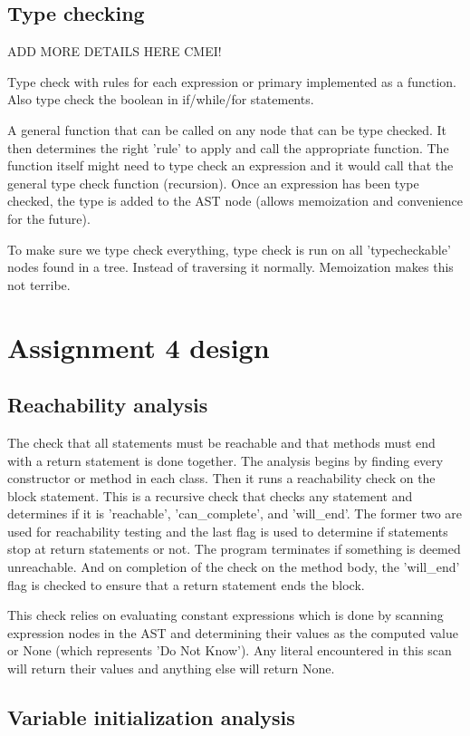 \documentclass[12pt]{article}
\begin{document}
\subsection{Type checking}
ADD MORE DETAILS HERE CMEI!

Type check with rules for each expression or primary implemented as a function.
Also type check the boolean in if/while/for statements.

A general function that can be called on any node that can be type checked.
It then determines the right 'rule' to apply and call the appropriate function.
The function itself might need to type check an expression and it would
call that the general type check function (recursion). Once an expression has been
type checked, the type is added to the AST node (allows memoization and convenience
for the future).

To make sure we type check everything, type check is run on all 'typecheckable'
nodes found in a tree. Instead of traversing it normally. Memoization makes this
not terribe.

\section{Assignment 4 design}

\subsection{Reachability analysis}
The check that all statements must be reachable and that methods must end with
a return statement is done together.
The analysis begins by finding every constructor or method in each class.
Then it runs a reachability check on the block statement.
This is a recursive check that checks any statement and determines if it is
'reachable', 'can_complete', and 'will_end'. The former two are used for
reachability testing and the last flag is used to determine if statements stop
at return statements or not. The program terminates if something is deemed
unreachable. And on completion of the check on the method body, the 'will_end'
flag is checked to ensure that a return statement ends the block.

This check relies on evaluating constant expressions which is done by scanning expression
nodes in the AST and determining their values as the computed value or None
(which represents 'Do Not Know'). Any literal encountered in this scan will return their
values and anything else will return None.

\subsection{Variable initialization analysis}
\end{document}
